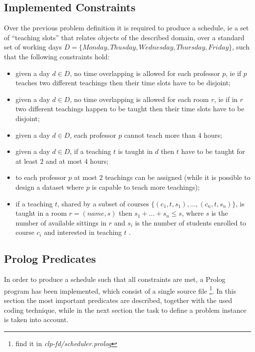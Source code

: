 \documentclass[10pt,a4paper]{article} %
\begin{document}
    \subsection{Implemented Constraints}
    Over the previous problem definition it is required to produce a
    schedule, ie a set of ``teaching slots'' that relates
    objects of the described domain, over a standard set of
    working days $D = \lbrace Monday, Thusday, Wednesday, Thursday, Friday \rbrace$,
    such that the following constraints hold:
    \begin{itemize}
        \item given a day $d \in D$, no time overlapping is allowed
            for each professor $p$,
            ie if $p$ teaches two different teachings then their time slots
            have to be disjoint;
        \item given a day $d \in D$, no time overlapping is allowed
            for each room $r$,
            ie if in $r$ two different teachings happen to be taught then
            their time slots have to be disjoint;
        \item given a day $d \in D$, each professor $p$ cannot teach more than
           $4$ hours;
        \item given a day $d \in D$, if a teaching $t$ is taught in $d$ then
            $t$ have to be taught for at least $2$ and at most $4$ hours;
        \item to each professor $p$ at most $2$ teachings can be assigned
            (while it is possible to design a dataset where $p$ is capable
            to teach more teachings);
        \item if a teaching $t$, shared by a subset of courses
            $\lbrace (c_1, t, s_1), \ldots, (c_n, t, s_n)\rbrace$,
            is taught in a room $r = (name, s)$ then $s_1 + \ldots + s_n \leq s$,
            where $s$ is the number of available sittings in $r$ and
            $s_i$ is the number of students enrolled
            to course $c_i$ and interested in teaching $t$ .
    \end{itemize}

    \subsection{Prolog Predicates}
    In order to produce a schedule such that all constraints are met,
    a Prolog program has been implemented, which consist of a single source file
    \footnote{ find it in \emph{clp-fd/scheduler.prolog}}. In this section the most
    important predicates are described, together with the used coding technique,
    while in the next section the task to define a problem instance is taken into
    account.
\end{document}

